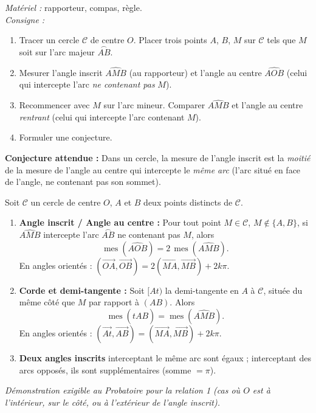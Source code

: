 \documentclass[11pt]{article}
\begin{document}
\begin{experience}
\emph{Matériel :} rapporteur, compas, règle.\\
\emph{Consigne :}
\begin{enumerate}
\item Tracer un cercle $\mathcal{C}$ de centre $O$. Placer trois points $A$, $B$, $M$ sur $\mathcal{C}$ tels que $M$ soit sur l'arc majeur $\overset{\frown}{AB}$.
\item Mesurer l'angle inscrit $\widehat{AMB}$ (au rapporteur) et l'angle au centre $\widehat{AOB}$ (celui qui intercepte l'arc \emph{ne contenant pas} $M$).
\item Recommencer avec $M$ sur l'arc mineur. Comparer $\widehat{AMB}$ et l'angle au centre \emph{rentrant} (celui qui intercepte l'arc contenant $M$).
\item Formuler une conjecture.
\end{enumerate}
\tcblower
\textbf{Conjecture attendue :} Dans un cercle, la mesure de l'angle inscrit est la \emph{moitié} de la mesure de l'angle au centre qui intercepte le \emph{même arc} (l'arc situé en face de l'angle, ne contenant pas son sommet).
\end{experience}

\begin{propriete}
Soit $\mathcal{C}$ un cercle de centre $O$, $A$ et $B$ deux points distincts de $\mathcal{C}$.
\begin{enumerate}
\item \textbf{Angle inscrit / Angle au centre :} Pour tout point $M \in \mathcal{C}$, $M \notin \{A,B\}$, si $\widehat{AMB}$ intercepte l'arc $\overset{\frown}{AB}$ ne contenant pas $M$, alors
\[
\operatorname{mes}(\widehat{AOB}) = 2\,\operatorname{mes}(\widehat{AMB}).
\]
En angles orientés : $(\overrightarrow{OA},\overrightarrow{OB}) = 2(\overrightarrow{MA},\overrightarrow{MB}) + 2k\pi$.
\item \textbf{Corde et demi-tangente :} Soit $[At)$ la demi-tangente en $A$ à $\mathcal{C}$, située du même côté que $M$ par rapport à $(AB)$. Alors
\[
\operatorname{mes}(\widehat{tAB}) = \operatorname{mes}(\widehat{AMB}).
\]
En angles orientés : $(\overrightarrow{At},\overrightarrow{AB}) = (\overrightarrow{MA},\overrightarrow{MB}) + 2k\pi$.
\item \textbf{Deux angles inscrits} interceptant le même arc sont égaux ; interceptant des arcs opposés, ils sont supplémentaires (somme $=\pi$).
\end{enumerate}
\textit{Démonstration exigible au Probatoire pour la relation 1 (cas où $O$ est à l'intérieur, sur le côté, ou à l'extérieur de l'angle inscrit).}
\end{propriete}
\end{document}
